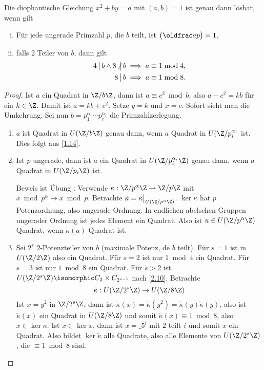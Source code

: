 \begin{st} \label{2.18}
	Die diophantische Gleichung $x^2 + by = a$ mit $(a,b) = 1$ ist genau dann lösbar, wenn gilt
	\begin{enumerate}[i)]
		\item
			Für jede ungerade Primzahl $p$, die $b$ teilt, ist $\legsym ap = 1$,
		\item
			falls $2$ Teiler von $b$, dann gilt
			\begin{align*}
				4 \divs b \land 8 \ndivs b & \implies a \equiv 1 \bmod 4, \\
				8 \divs b & \implies a \equiv 1 \bmod 8.
			\end{align*}
	\end{enumerate}
	\begin{proof}
		Ist $a$ ein Quadrat in $\Z / b\Z$, dann ist $a \equiv c^2 \bmod b$, also $a-c^2 = kb$ für ein $k \in \Z$.
		Damit ist $a = kb + c^2$.
		Setze $y = k$ und $x = c$.
		Sofort sieht man die Umkehrung.
		Sei nun $b = p_1^{\alpha_1} \dotsb p_r^{\alpha_r}$ die Primzahlzerlegung.
		\begin{enumerate}[1)]
			\item
				$a$ ist Quadrat in $U(\Z / b \Z)$ genau dann, wenn $a$ Quadrat in $U(\Z /p_i^{\alpha_i}$ ist.
				Dies folgt aus \ref{1.14}.
			\item
				Ist $p$ ungerade, dann ist $a$ ein Quadrat in $U(\Z / p_i^{\alpha_i} \Z)$ genau dann, wenn $a$ Quadrat in $U(\Z/p_i \Z)$ ist.

				Beweis ist Übung \Exercise: Verwende $\kappa: \Z / p^{\alpha} \Z \to \Z / p \Z$ mit $x \bmod p^\alpha \mapsto x \bmod p$.
				Betrachte $\tilde \kappa = \kappa\big|_{U(\Z / p^{\alpha} \Z)}$.
				$\ker \tilde \kappa$ hat $p$ Potenzordnung, also ungerade Ordnung.
				In endlichen abelschen Gruppen ungerader Ordnung ist jedes Element ein Quadrat.
				Also ist $u \in U(\Z / p^{\alpha} \Z)$ Quadrat, wenn $\tilde \kappa(a)$ Quadrat ist.
			\item
				Sei $2^s$ $2$-Potenzteiler von $b$ (maximale Potenz, de $b$ teilt).
				Für $s = 1$ ist in $U(\Z / 2\Z)$ also ein Quadrat.
				Für $s = 2$ ist nur $1 \bmod 4$ ein Quadrat.
				Für $s = 3$ ist nur $1 \bmod 8$ ein Quadrat.
				Für $s > 2$ ist $U(\Z / 2^s \Z) \isomorphic C_2 \times C_{2^{s-1}}$ nach \ref{2.10}.
				Betrachte
				\[
					\tilde \kappa: U(\Z / 2^s \Z) \to U(\Z / 8\Z)
				\]
				Ist $x = y^2$ in $\Z / 2^s\Z$, dann ist $\tilde \kappa(x) = \tilde \kappa(y^2) = \tilde \kappa(y) \tilde \kappa(y)$, also ist $\tilde \kappa(x)$ ein Quadrat in $U(\Z / 8\Z)$ und somit $\tilde \kappa(x) \equiv 1 \bmod 8$, also $x \in \ker \tilde \kappa$.
				Ist $x \in \ker \tilde x$, dann ist $x = \_5^i$ mit $2$ teilt $i$ und somit $x$ ein Quadrat.
				Also bildet $\ker \tilde \kappa$ alle Quadrate, also alle Elemente von $U(\Z / 2^s \Z)$, die $\equiv 1 \bmod 8$ sind.
		\end{enumerate}
	\end{proof}
\end{st}







